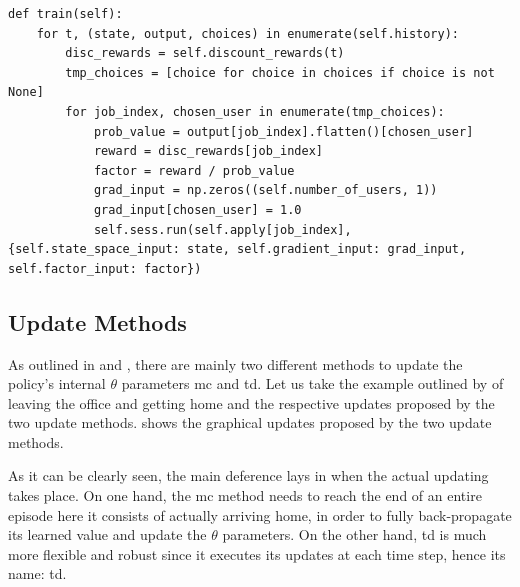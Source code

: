 \begin{lstlisting}[caption={Backpropagation algorithm following a \glsentryshort{mc} update approach. Initially rewards are discounted which are eventually used to calculate the multiplying factor for the partial derivatives.},label=lst:mc_backpropagation,style=CustomPython]
def train(self):
    for t, (state, output, choices) in enumerate(self.history):
        disc_rewards = self.discount_rewards(t)
        tmp_choices = [choice for choice in choices if choice is not None]
        for job_index, chosen_user in enumerate(tmp_choices):
            prob_value = output[job_index].flatten()[chosen_user]
            reward = disc_rewards[job_index]
            factor = reward / prob_value
            grad_input = np.zeros((self.number_of_users, 1))
            grad_input[chosen_user] = 1.0
            self.sess.run(self.apply[job_index], {self.state_space_input: state, self.gradient_input: grad_input, self.factor_input: factor})
\end{lstlisting}

\subsection{Update Methods}
\label{subsec:update_methods}

As outlined in  and , there are mainly two different methods to update the policy's internal $\theta$ parameters \ie \gls{mc} and \gls{td}. Let us take the example outlined by \citet[p. 130]{Sutton2017} of leaving the office and getting home and the respective updates proposed by the two update methods.  shows the graphical updates proposed by the two update methods.


As it can be clearly seen, the main deference lays in when the actual updating takes place. On one hand, the \gls{mc} method needs to reach the end of an entire episode \eg here it consists of actually arriving home, in order to fully back-propagate its learned value and update the $\theta$ parameters. On the other hand, \gls{td} is much more flexible and robust since it executes its updates at each time step, hence its name: \gls{td}.

